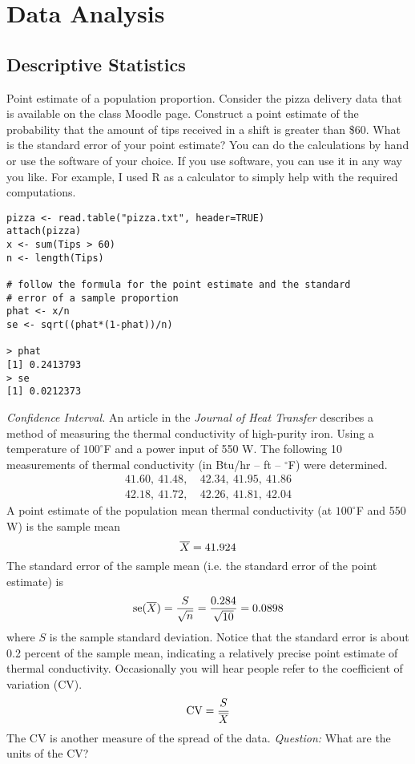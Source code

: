 \chapter{Data Analysis}
\label{data-analysis}

\section{Descriptive Statistics}

Point estimate of a population proportion. Consider the
  pizza delivery data that is available on the class Moodle
  page. Construct a point estimate of the probability that the amount
  of tips received in a shift is greater than \$60. What is the
  standard error of your point estimate? You can do the calculations
  by hand or use the software of your choice. If you use software, you
  can use it in any way you like.  For example, I used R as a
  calculator to simply help with the required computations.
  
\begin{Verbatim}
pizza <- read.table("pizza.txt", header=TRUE)
attach(pizza)
x <- sum(Tips > 60)
n <- length(Tips)

# follow the formula for the point estimate and the standard
# error of a sample proportion
phat <- x/n
se <- sqrt((phat*(1-phat))/n)

> phat
[1] 0.2413793
> se
[1] 0.0212373
\end{Verbatim}

  \emph{Confidence Interval.}  An article in the \emph{Journal of Heat
    Transfer} describes a method of measuring the thermal conductivity
  of high-purity iron.  Using a temperature of $100^{\circ}$F and a
  power input of 550 W. The following 10 measurements of thermal
  conductivity (in Btu/hr -- ft -- ${}^{\circ}$F) were determined.
\begin{align*}
  41.60,~41.48,~&42.34,~41.95,~41.86\\
  42.18,~41.72,~&42.26,~41.81,~42.04
\end{align*}
A point estimate of the population mean thermal conductivity
(at $100^{\circ}$F and 550 W) is the sample mean
\[
  \overline{X} = 41.924
\]
The standard error of the sample mean (i.e. the standard error
of the point estimate) is
\[
  \text{se}(\overline{X}) = \frac{S}{\sqrt{n}} = \frac{0.284}{\sqrt{10}} = 0.0898
\]
where $S$ is the sample standard deviation. Notice that the standard
error is about 0.2 percent of the sample mean, indicating a relatively
precise point estimate of thermal conductivity. Occasionally you will
hear people refer to the coefficient of variation (CV).
\[
  \text{CV} = \frac{S}{\overline{X}}
\]
The CV is another measure of the spread of the data. \emph{Question:}
What are the units of the CV?

